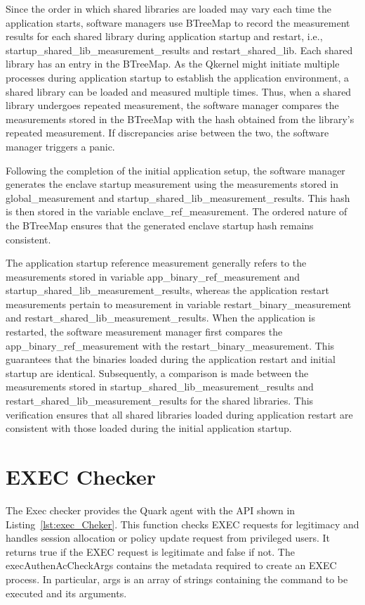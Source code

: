 Since the order in which shared libraries are loaded may vary each time the application starts, software managers use BTreeMap to record the measurement results for each shared library during application startup and restart, i.e., startup\_shared\_lib\_measurement\_results and restart\_shared\_lib.
Each shared library has an entry in the BTreeMap. As the Qkernel might initiate multiple processes during application startup to establish the application environment, a shared library can be loaded and measured multiple times. Thus, when a shared library undergoes repeated measurement, 
the software manager compares the measurements stored in the BTreeMap with the hash obtained from the library's repeated measurement. If discrepancies arise between the two, the software manager triggers a panic.


Following the completion of the initial application setup, the software manager generates the enclave startup measurement using the measurements stored in global\_measurement and startup\_shared\_lib\_measurement\_results. This hash is then stored in the variable enclave\_ref\_measurement. The ordered 
nature of the BTreeMap ensures that the generated enclave startup hash remains consistent. 

The application startup reference measurement generally refers to the measurements stored in variable app\_binary\_ref\_measurement and startup\_shared\_lib\_measurement\_results, whereas the application restart measurements pertain to measurement in variable restart\_binary\_measurement and 
restart\_shared\_lib\_measurement\_results. When the application is restarted, the software measurement manager first compares the app\_binary\_ref\_measurement with the restart\_binary\_measurement. This guarantees that the binaries loaded during the application restart and initial startup are 
identical. Subsequently, a comparison is made between the measurements stored in startup\_shared\_lib\_measurement\_results and restart\_shared\_lib\_measurement\_results for the shared libraries. This verification ensures that all shared libraries loaded during application restart are consistent 
with those loaded during the initial application startup.

\section{EXEC Checker}
The Exec checker provides the Quark agent with the API shown in Listing~\ref{lst:exec_Cheker}. This function checks EXEC requests for legitimacy and handles session allocation or  policy update request from privileged users. It returns true if the EXEC request is legitimate and false if not. 
The execAuthenAcCheckArgs contains the metadata required to create an EXEC process. In particular, args is an array of strings containing the command to be executed and its arguments. 

